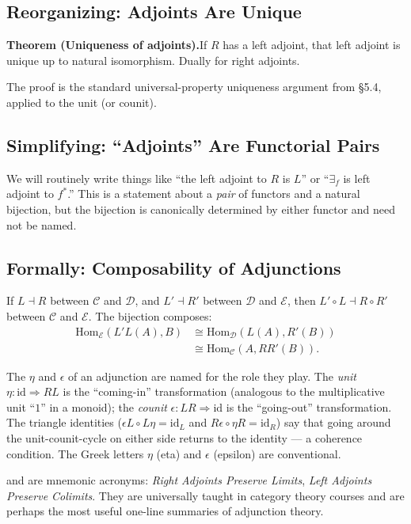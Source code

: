 \subsection{Reorganizing: Adjoints Are Unique}

\textbf{Theorem (Uniqueness of adjoints).}\quad If $R$ has a left adjoint,
that left adjoint is unique up to natural isomorphism. Dually for right
adjoints.

The proof is the standard universal-property uniqueness argument from
\S5.4, applied to the unit (or counit).

\subsection{Simplifying: ``Adjoints'' Are Functorial Pairs}

We will routinely write things like ``the left adjoint to $R$ is $L$''
or ``$\exists_f$ is left adjoint to $f^*$.'' This is a statement about
a \emph{pair} of functors and a natural bijection, but the bijection is
canonically determined by either functor and need not be named.

\subsection{Formally: Composability of Adjunctions}

If $L \dashv R$ between $\mathcal{C}$ and $\mathcal{D}$, and $L' \dashv R'$
between $\mathcal{D}$ and $\mathcal{E}$, then $L' \circ L \dashv R \circ R'$
between $\mathcal{C}$ and $\mathcal{E}$. The bijection composes:
\begin{align*}
  \mathrm{Hom}_\mathcal{E}(L'L(A), B)
    &\cong \mathrm{Hom}_\mathcal{D}(L(A), R'(B)) \\
    &\cong \mathrm{Hom}_\mathcal{C}(A, R R'(B)).
\end{align*}


\begin{nameorigin}
The  $\eta$ and  $\epsilon$ of an adjunction are
named for the role they play. The \emph{unit} $\eta : \mathrm{id} \Rightarrow
RL$ is the ``coming-in'' transformation (analogous to the multiplicative
unit ``$1$'' in a monoid); the \emph{counit} $\epsilon : LR \Rightarrow
\mathrm{id}$ is the ``going-out'' transformation. The triangle identities
($\epsilon L \circ L\eta = \mathrm{id}_L$ and $R\epsilon \circ \eta R =
\mathrm{id}_R$) say that going around the unit-counit-cycle on either
side returns to the identity — a coherence condition. The Greek letters
$\eta$ (eta) and $\epsilon$ (epsilon) are conventional.

 and  are mnemonic acronyms: \emph{Right Adjoints
Preserve Limits}, \emph{Left Adjoints Preserve Colimits}. They are
universally taught in category theory courses and are perhaps the most
useful one-line summaries of adjunction theory.
\end{nameorigin}


